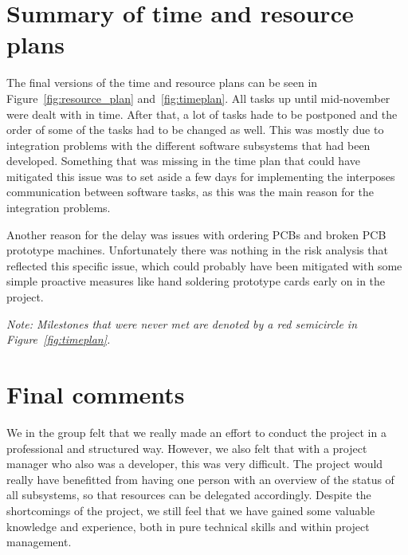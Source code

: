 \documentclass[11pt, titlepage]{article} %
\begin{document}
\section{Summary of time and resource plans}
The final versions of the time and resource plans can be seen in Figure~\ref{fig:resource_plan}
and~\ref{fig:timeplan}. All tasks up until mid-november were dealt with in time. After that,
a lot of tasks hade to be postponed and the order of some of the tasks had to be changed as well.
This was mostly due to integration problems with the different software subsystems that had
been developed. Something that was missing in the time plan that could have mitigated this issue
was to set aside a few days for implementing the interposes communication between software tasks,
as this was the main reason for the integration problems.

Another reason for the delay was issues with ordering PCBs and broken PCB
prototype machines. Unfortunately there was nothing in the risk analysis that reflected
this specific issue, which could probably have been mitigated with some simple proactive
measures like hand soldering prototype cards early on in the project.

\textit{Note: Milestones that were never met are denoted by a red semicircle in
Figure~\ref{fig:timeplan}.}

\section{Final comments}
We in the group felt that we really made an effort to conduct the project in a professional
and structured way. However, we also felt that with a project manager who also was a developer,
this was very difficult. The project would really have benefitted from having one person with an
overview of the status of all subsystems, so that resources can be delegated accordingly.
Despite the shortcomings of the project, we still feel that we have gained some valuable knowledge
and experience, both in pure technical skills and within project management.


\clearpage




\clearpage
\clearpage

\appendix
\end{document}
